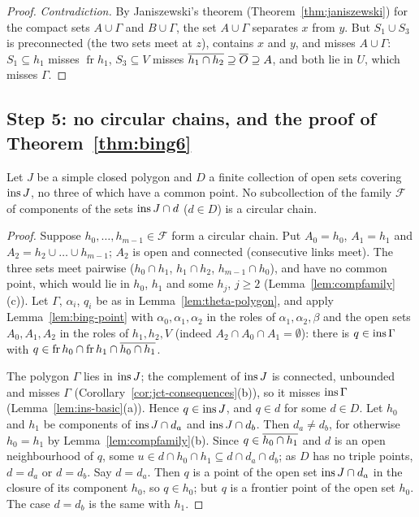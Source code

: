 \begin{proof}
\emph{Contradiction.} By Janiszewski's theorem (Theorem~\ref{thm:janiszewski}) for the compact sets
$A\cup\Gamma$ and $B\cup\Gamma$, the set $A\cup\Gamma$ separates $x$ from $y$. But $S_1\cup S_3$ is
preconnected (the two sets meet at $z$), contains $x$ and $y$, and misses $A\cup\Gamma$: $S_1\subseteq
h_1$ misses $\operatorname{fr}h_1$, $S_3\subseteq V$ misses $\overline{h_1\cap h_2}\supseteq\overline{O}\supseteq A$,
and both lie in $U$, which misses $\Gamma$.
\end{proof}


\subsection*{Step 5: no circular chains, and the proof of Theorem~\ref{thm:bing6}}

\begin{proposition}\label{prop:no-circular}
Let $J$ be a simple closed polygon and $D$ a finite collection of open sets covering $\operatorname{ins} J$, no
three of which have a common point. No subcollection of the family $\mathcal F$ of components of the
sets $\operatorname{ins} J\cap d$ ($d\in D$) is a circular chain.
\end{proposition}

\begin{proof}
Suppose $h_0,\dots,h_{m-1}\in\mathcal F$ form a circular chain. Put $A_0=h_0$, $A_1=h_1$ and
$A_2=h_2\cup\dots\cup h_{m-1}$; $A_2$ is open and connected (consecutive links meet). The three sets
meet pairwise ($h_0\cap h_1$, $h_1\cap h_2$, $h_{m-1}\cap h_0$), and have no common point, which would
lie in $h_0$, $h_1$ and some $h_j$, $j\ge2$ (Lemma~\ref{lem:compfamily}(c)). Let $\Gamma$, $\alpha_i$,
$q_i$ be as in Lemma~\ref{lem:theta-polygon}, and apply Lemma~\ref{lem:bing-point} with
$\alpha_0,\alpha_1,\alpha_2$ in the roles of $\alpha_1,\alpha_2,\beta$ and the open sets $A_0,A_1,A_2$ in the
roles of $h_1,h_2,V$ (indeed $A_2\cap A_0\cap A_1=\emptyset$): there is $q\in\operatorname{ins}\Gamma$ with $q\in\operatorname{fr}h_0\cap
\operatorname{fr}h_1\cap\overline{h_0\cap h_1}$.

The polygon $\Gamma$ lies in $\operatorname{ins} J$; the complement of $\operatorname{ins} J$ is connected, unbounded and misses
$\Gamma$ (Corollary~\ref{cor:jct-consequences}(b)), so it misses $\operatorname{ins}\Gamma$
(Lemma~\ref{lem:ins-basic}(a)). Hence $q\in\operatorname{ins} J$, and $q\in d$ for some $d\in D$. Let $h_0$ and $h_1$ be
components of $\operatorname{ins} J\cap d_a$ and $\operatorname{ins} J\cap d_b$. Then $d_a\neq d_b$, for otherwise $h_0=h_1$ by
Lemma~\ref{lem:compfamily}(b). Since $q\in\overline{h_0\cap h_1}$ and $d$ is an open neighbourhood of $q$,
some $u\in d\cap h_0\cap h_1\subseteq d\cap d_a\cap d_b$; as $D$ has no triple points, $d=d_a$ or
$d=d_b$. Say $d=d_a$. Then $q$ is a point of the open set $\operatorname{ins} J\cap d_a$ in the closure of its
component $h_0$, so $q\in h_0$; but $q$ is a frontier point of the open set $h_0$. The case $d=d_b$ is
the same with $h_1$.
\end{proof}

